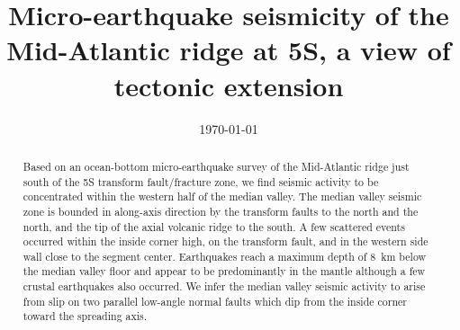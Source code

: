 \documentclass[jgr]{aguplus}
\newlength{\tw}
\begin{document}
\title{Micro-earthquake seismicity of the Mid-Atlantic ridge at
 5\dg S, a view of tectonic extension}
\date{\today}

\begin{abstract}
Based on an  ocean-bottom micro-earthquake survey of the
Mid-Atlantic ridge just south of the 5\dg S transform fault/fracture
zone, we find seismic activity to be concentrated within the western
half of the median valley.  The median valley seismic zone is bounded
in along-axis direction by the transform faults to the north and the
north, and the tip of the axial volcanic ridge to the south.  A few
scattered events occurred within the inside corner high, on the
transform fault, and in the western side wall close to the segment
center. Earthquakes reach a maximum depth of 8~km below the median
valley floor and appear to be predominantly in the mantle although a
few crustal earthquakes also occurred.  We infer the median valley
seismic activity to arise from slip on two parallel low-angle normal
faults which dip from the inside corner toward the spreading axis.
\end{abstract}
\end{document}
